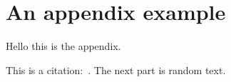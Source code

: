 \chapter{An appendix example}
\label{appendix:c2}

Hello this is the appendix.

This is a citation:~\cite{Guyton:1956:TextbookPhysiology}.
The next part is random text.

\lipsum

\printbibliography[heading=subbibliography]

